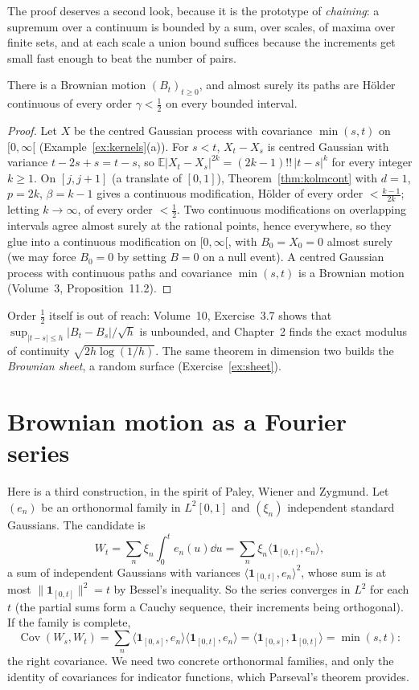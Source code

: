 The proof deserves a second look, because it is the prototype of \emph{chaining}: a supremum over a continuum is bounded by a sum, over scales, of maxima over finite sets, and at each scale a union bound
suffices because the increments get small fast enough to beat the number of pairs.

\begin{corollary}\label{cor:bmholder}
There is a Brownian motion $(B_t)_{t\ge0}$, and almost surely its paths are H\"older continuous of every order $\gamma<\frac12$ on every bounded interval.
\end{corollary}

\begin{proof}
Let $X$ be the centred Gaussian process with covariance $\min(s,t)$ on $[0,\infty[$ (Example~\ref{ex:kernels}(a)). For $s<t$, $X_t-X_s$ is centred Gaussian with variance $t-2s+s=t-s$, so
$\mathbb E|X_t-X_s|^{2k}=(2k-1)!!\,|t-s|^k$ for every integer $k\ge1$. On $[j,j+1]$ (a translate of $[0,1]$), Theorem~\ref{thm:kolmcont} with $d=1$, $p=2k$, $\beta=k-1$ gives a continuous modification, H\"older of
every order $<\frac{k-1}{2k}$; letting $k\to\infty$, of every order $<\frac12$. Two continuous modifications on overlapping intervals agree almost surely at the rational points, hence everywhere, so they glue into a
continuous modification on $[0,\infty[$, with $B_0=X_0=0$ almost surely (we may force $B_0=0$ by setting $B=0$ on a null event). A centred Gaussian process with continuous paths and covariance $\min(s,t)$ is a
Brownian motion (Volume~3, Proposition~11.2).
\end{proof}

Order $\frac12$ itself is out of reach: Volume~10, Exercise~3.7 shows that $\sup_{|t-s|\le h}|B_t-B_s|/\sqrt h$ is unbounded, and Chapter~2 finds the exact modulus of continuity $\sqrt{2h\log(1/h)}$.
The same theorem in dimension two builds the \emph{Brownian sheet}, a random surface (Exercise~\ref{ex:sheet}).

\section{Brownian motion as a Fourier series}

Here is a third construction, in the spirit of Paley, Wiener and Zygmund. Let $(e_n)$ be an orthonormal family in $L^2[0,1]$ and $(\xi_n)$ independent standard Gaussians. The candidate is
\[
W_t=\sum_n\xi_n\int_0^te_n(u)\dd u=\sum_n\xi_n\langle\mathbf 1_{[0,t]},e_n\rangle,
\]
a sum of independent Gaussians with variances $\langle\mathbf 1_{[0,t]},e_n\rangle^2$, whose sum is at most $\|\mathbf 1_{[0,t]}\|^2=t$ by Bessel's inequality. So the series converges in $L^2$ for each $t$ (the partial sums
form a Cauchy sequence, their increments being orthogonal). If the family is complete,
\[
\operatorname{Cov}(W_s,W_t)=\sum_n\langle\mathbf 1_{[0,s]},e_n\rangle\langle\mathbf 1_{[0,t]},e_n\rangle=\langle\mathbf 1_{[0,s]},\mathbf 1_{[0,t]}\rangle=\min(s,t):
\]
the right covariance. We need two concrete orthonormal families, and only the identity of covariances for indicator functions, which Parseval's theorem provides.

